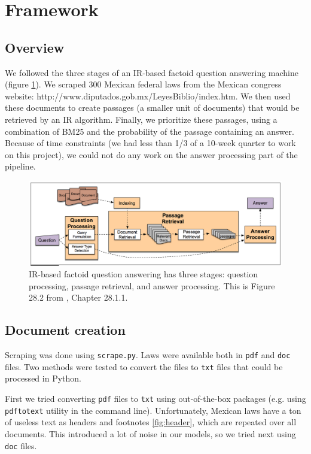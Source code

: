 \documentclass[letterpaper]{article}
\begin{document}
\section{Framework}
\label{sec:theory}

\subsection{Overview}

We followed the three stages of an IR-based factoid question answering machine (figure \ref{fig:pipeline}). We scraped 300 Mexican federal laws from the Mexican congress website: http://www.diputados.gob.mx/LeyesBiblio/index.htm. We then used these documents to create passages (a smaller unit of documents) that would be retrieved by an IR algorithm. Finally, we prioritize these passages, using a combination of BM25 and the probability of the passage containing an answer. Because of time constraints (we had less than 1/3 of a 10-week quarter to work on this project), we could not do any work on the answer processing part of the pipeline.

\begin{figure}
\centering
\includegraphics[width=1\textwidth]{pipeline.png}
\caption{\label{fig:pipeline}IR-based factoid question answering has three stages: question processing, passage retrieval, and answer processing. This is Figure 28.2 from \cite{jurafsky}, Chapter 28.1.1.}
\end{figure}

\subsection{Document creation}
Scraping was done using \texttt{scrape.py}. Laws were available both in \texttt{pdf} and \texttt{doc} files. Two methods were tested to convert the files to \texttt{txt} files that could be processed in Python. 

First we tried converting \texttt{pdf} files to \texttt{txt} using out-of-the-box packages (e.g. using \texttt{pdftotext} utility in the command line). Unfortunately, Mexican laws have a ton of useless text as headers and footnotes \ref{fig:header}, which are repeated over all documents. This introduced a lot of noise in our models, so we tried next using \texttt{doc} files.
\end{document}
